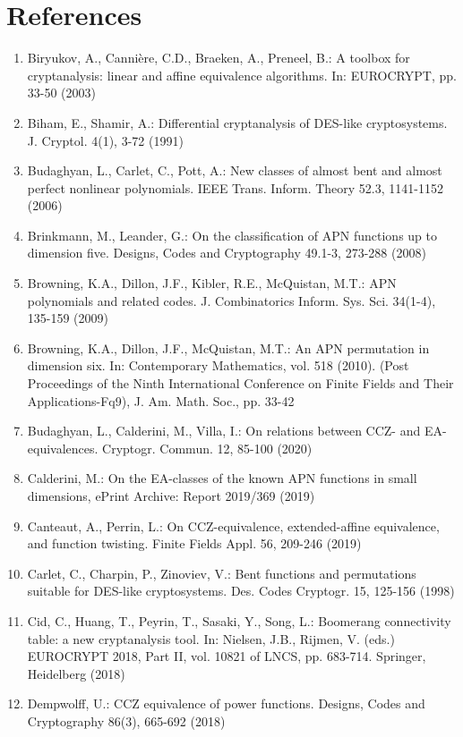 \documentclass[10pt]{article}
\begin{document}
\section*{References}
\begin{enumerate}
  \item Biryukov, A., Cannière, C.D., Braeken, A., Preneel, B.: A toolbox for cryptanalysis: linear and affine equivalence algorithms. In: EUROCRYPT, pp. 33-50 (2003)
  \item Biham, E., Shamir, A.: Differential cryptanalysis of DES-like cryptosystems. J. Cryptol. 4(1), 3-72 (1991)
  \item Budaghyan, L., Carlet, C., Pott, A.: New classes of almost bent and almost perfect nonlinear polynomials. IEEE Trans. Inform. Theory 52.3, 1141-1152 (2006)
  \item Brinkmann, M., Leander, G.: On the classification of APN functions up to dimension five. Designs, Codes and Cryptography 49.1-3, 273-288 (2008)
  \item Browning, K.A., Dillon, J.F., Kibler, R.E., McQuistan, M.T.: APN polynomials and related codes. J. Combinatorics Inform. Sys. Sci. 34(1-4), 135-159 (2009)
  \item Browning, K.A., Dillon, J.F., McQuistan, M.T.: An APN permutation in dimension six. In: Contemporary Mathematics, vol. 518 (2010). (Post Proceedings of the Ninth International Conference on Finite Fields and Their Applications-Fq9), J. Am. Math. Soc., pp. 33-42
  \item Budaghyan, L., Calderini, M., Villa, I.: On relations between CCZ- and EA-equivalences. Cryptogr. Commun. 12, 85-100 (2020)
  \item Calderini, M.: On the EA-classes of the known APN functions in small dimensions, ePrint Archive: Report 2019/369 (2019)
  \item Canteaut, A., Perrin, L.: On CCZ-equivalence, extended-affine equivalence, and function twisting. Finite Fields Appl. 56, 209-246 (2019)
  \item Carlet, C., Charpin, P., Zinoviev, V.: Bent functions and permutations suitable for DES-like cryptosystems. Des. Codes Cryptogr. 15, 125-156 (1998)
  \item Cid, C., Huang, T., Peyrin, T., Sasaki, Y., Song, L.: Boomerang connectivity table: a new cryptanalysis tool. In: Nielsen, J.B., Rijmen, V. (eds.) EUROCRYPT 2018, Part II, vol. 10821 of LNCS, pp. 683-714. Springer, Heidelberg (2018)
  \item Dempwolff, U.: CCZ equivalence of power functions. Designs, Codes and Cryptography 86(3), 665-692 (2018)

\end{enumerate}
\end{document}
